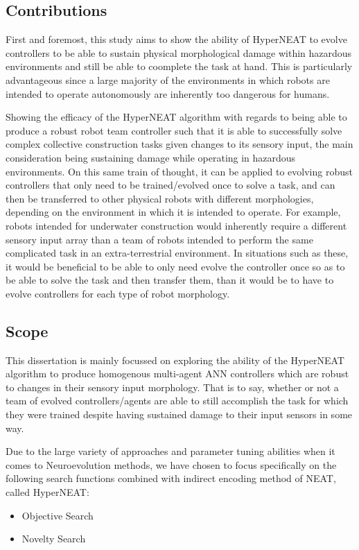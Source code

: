 {\subsection{Contributions}

First and foremost, this study aims to show the ability of HyperNEAT to evolve controllers to be able to sustain physical morphological damage within hazardous environments and still be able to coomplete the task at hand. This is particularly advantageous since a large majority of the environments in which robots are intended to operate autonomously are inherently too dangerous for humans.

Showing the efficacy of the HyperNEAT algorithm with regards to being able to produce a robust robot team controller such that it is able to successfully solve complex collective construction tasks given changes to its sensory input, the main consideration being sustaining damage while operating in hazardous environments. On this same train of thought, it can be applied to evolving robust controllers that only need to be trained/evolved once to solve a task, and can then be transferred to other physical robots with different morphologies, depending on the environment in which it is intended to operate. For example, robots intended for underwater construction would inherently require a different sensory input array than a team of robots intended to perform the same complicated task in an extra-terrestrial environment. In situations such as these, it would be beneficial to be able to only need evolve the controller once so as to be able to solve the task and then transfer them, than it would be to have to evolve controllers for each type of robot morphology.


\subsection{Scope}

This dissertation is mainly focussed on exploring the ability of the HyperNEAT algorithm to produce homogenous multi-agent ANN controllers which are robust to changes in their sensory input morphology. That is to say, whether or not a team of evolved controllers/agents are able to still accomplish the task for which they were trained despite having sustained damage to their input sensors in some way.

Due to the large variety of approaches and parameter tuning abilities when it comes to Neuroevolution methods, we have chosen to focus specifically on the following search functions combined with indirect encoding method of NEAT, called HyperNEAT:
\begin{itemize}
	\item Objective Search
	\item Novelty Search
\end{itemize}

}
